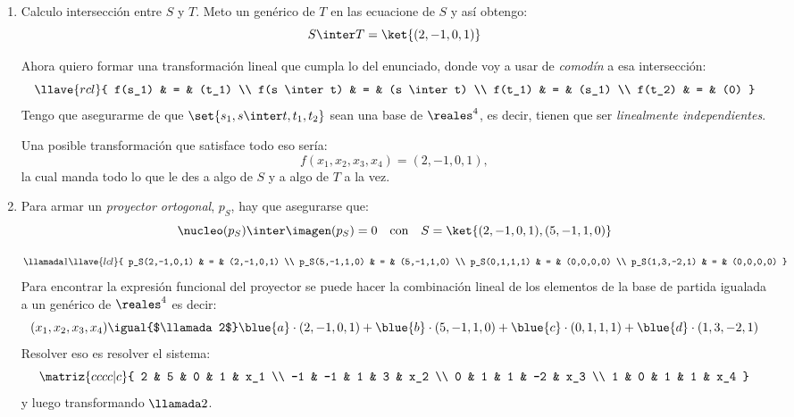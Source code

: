 \begin{enumerate}[label=\alph*)]
  \item Calculo intersección entre $S$ y $T$. Meto un genérico de $T$ en las ecuacione de $S$ y así obtengo:
        $$
          S \inter T = \ket{(2,-1,0,1)}
        $$

        Ahora quiero formar una transformación lineal que cumpla lo del enunciado, donde voy a usar de \textit{comodín}
        a esa intersección:
        $$
          \llave{rcl}{
            f(s_1) & = & (t_1)  \\
            f(s \inter t) & = & (s \inter t) \\
            f(t_1) & = & (s_1) \\
            f(t_2) & = & (0)
          }
        $$
        Tengo que asegurarme de que $\set{s_1, s \inter t, t_1, t_2}$ sean una base de $\reales^4$, es decir,
        tienen que ser \textit{linealmente independientes}.

        Una posible transformación que satisface todo eso sería:
        $$
          f(x_1, x_2, x_3, x_4) = (2, -1, 0, 1),
        $$
        la cual manda todo lo que le des a algo de $S$ y a algo de $T$ a la vez.

  \item Para armar un \textit{proyector ortogonal}, $p_S$, hay que asegurarse que:
        $$
          \nucleo(p_S) \inter \imagen(p_S) = 0
          \quad \text{con} \quad
          S = \ket{(2,-1,0,1), (5,-1,1,0)}
        $$

        $$
          \llamada1
          \llave{lcl}{
            p_S(2,-1,0,1) & = & (2,-1,0,1) \\
            p_S(5,-1,1,0) & = & (5,-1,1,0) \\
            p_S(0,1,1,1) & = & (0,0,0,0) \\
            p_S(1,3,-2,1) & = & (0,0,0,0)
          }
        $$
        Para encontrar la expresión funcional del proyector se puede hacer la combinación lineal
        de los elementos de la base de partida igualada a un genérico de $\reales^4$ es decir:
        $$
          (x_1, x_2, x_3, x_4) \igual{$\llamada2$}
          \blue{a} \cdot (2,-1,0,1) +
          \blue{b} \cdot (5,-1,1,0) +
          \blue{c} \cdot (0,1,1,1) +
          \blue{d} \cdot (1,3,-2,1)
        $$
        Resolver eso es resolver el sistema:
        $$
          \matriz{cccc|c}{
            2 & 5 & 0 & 1 & x_1 \\
            -1 & -1 & 1 & 3 & x_2 \\
            0 & 1 & 1 & -2 & x_3 \\
            1 & 0 & 1 & 1 & x_4
          }
        $$
        y luego transformando $\llamada2$.


\end{enumerate}
